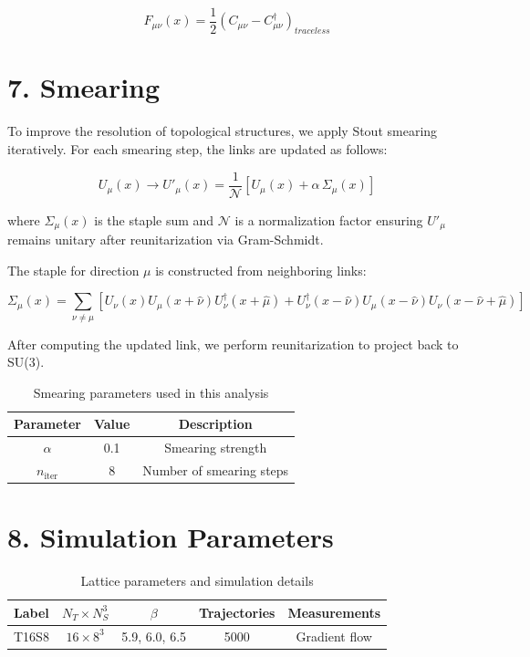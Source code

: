 \documentclass[12pt,a4paper]{article}
\begin{document}
\begin{equation}
F_{\mu\nu}(x) = \frac{1}{2}(C_{\mu\nu}-C_{\mu\nu}^\dagger)_{traceless} 
\end{equation}

\section*{7.  Smearing}

To improve the resolution of topological structures, we apply Stout smearing iteratively. For each smearing step, the links are updated as follows:

\begin{equation}
U_\mu(x) \to U'_\mu(x) = \frac{1}{\mathcal{N}} \left[ U_\mu(x) + \alpha \, \Sigma_\mu(x) \right]
\end{equation}

where $\Sigma_\mu(x)$ is the staple sum and $\mathcal{N}$ is a normalization factor ensuring $U'_\mu$ remains unitary after reunitarization via Gram-Schmidt.

The staple for direction $\mu$ is constructed from neighboring links:

\begin{equation}
\Sigma_\mu(x) = \sum_{\nu \neq \mu} \left[ U_\nu(x) U_\mu(x+\hat{\nu}) U_\nu^\dagger(x+\hat \mu) + 
U_\nu^\dagger(x-\hat{\nu}) U_\mu(x-\hat{\nu}) U_\nu(x-\hat{\nu}+\hat\mu) \right]
\end{equation}

After computing the updated link, we perform reunitarization to project back to SU(3).

\begin{table}[H]
\centering
\caption{Smearing parameters used in this analysis}
\begin{tabular}{|c|c|c|}
\hline
Parameter & Value & Description \\
\hline
$\alpha$ & 0.1 & Smearing strength \\
$n_{\text{iter}}$ & 8 & Number of smearing steps \\
\hline
\end{tabular}
\end{table}

\section*{8. Simulation Parameters}

\begin{table}[H]
\centering
\caption{Lattice parameters and simulation details}
\begin{tabular}{|c|c|c|c|c|}
\hline
Label & $N_T \times N_S^3$ & $\beta$ & Trajectories & Measurements \\
\hline
T16S8 & $16 \times 8^3$ & 5.9, 6.0, 6.5 & 5000 & Gradient flow \\
\hline
\end{tabular}
\end{table}
\end{document}
